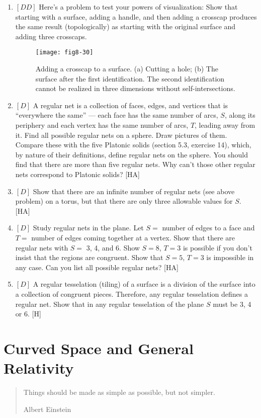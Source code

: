 \documentclass{book}
\begin{document}
\begin{enumerate}
\item $[DD]$ Here's a problem to test your powers of visualization: Show
that starting with a surface, adding a handle, and then adding a crosscap
produces the same result (topologically) as starting with the original
surface and adding three crosscaps.

\begin{figure}
\begin{center}
\texttt{[image: fig8-30]}
\caption{Adding a crosscap to a surface. (a) Cutting a hole; (b) The surface after the first identification. The second identification cannot be realized in three dimensions without self-intersections.}
\end{center}
\end{figure}

\item $[D]$ A regular net is a collection of faces, edges, and vertices that
is ``everywhere the same'' --- each face has the same number of arcs, $S$,
along its periphery and each vertex has the same number of arcs, $T$,
leading away from it. Find all possible regular nets on a sphere. Draw
pictures of them. Compare these with the five Platonic solids (section
5.3, exercise 14), which, by nature of their definitions, define regular nets
on the sphere. You should find that there are more than five regular
nets. Why can't those other regular nets correspond to Platonic solids?
[HA]

\item $[D]$ Show that there are an infinite number of regular nets (see above
problem) on a torus, but that there are only three allowable values for
$S$. [HA]

\item $[D]$ Study regular nets in the plane. Let $S =$ number of edges to a
face and $T =$ number of edges coming together at a vertex. Show that
there are regular nets with $S =$ 3, 4, and 6. Show $S = 8$, $T = 3$ is
possible if you don't insist that the regions are congruent. Show that
$S = 5$, $T = 3$ is impossible in any case. Can you list all possible regular
nets? [HA]

\item $[D]$ A regular tesselation (tiling) of a surface is a division of the
surface into a collection of congruent pieces. Therefore, any regular
tesselation defines a regular net. Show that in any regular tesselation of
the plane $S$ must be 3, 4 or 6. [H]
\end{enumerate}

\chapter{Curved Space and General Relativity}
\begin{quote}
Things should be made as simple as possible, but
not simpler.

Albert Einstein
\end{quote}
\end{document}
